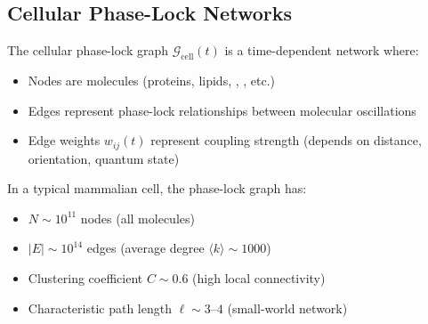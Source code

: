 \subsection{Cellular Phase-Lock Networks}

\begin{definition}
\label{def:cellular_phase_lock}
The cellular phase-lock graph $\mathcal{G}_{\text{cell}}(t)$ is a time-dependent network where:
\begin{itemize}
\item Nodes are molecules (proteins, lipids, , , etc.)
\item Edges represent phase-lock relationships between molecular oscillations
\item Edge weights $w_{ij}(t)$ represent coupling strength (depends on distance, orientation, quantum state)
\end{itemize}
\end{definition}

\begin{theorem}
\label{thm:cellular_density}
In a typical mammalian cell, the phase-lock graph has:
\begin{itemize}
\item $N \sim 10^{11}$ nodes (all molecules)
\item $|E| \sim 10^{14}$ edges (average degree $\langle k \rangle \sim 1000$)
\item Clustering coefficient $C \sim 0.6$ (high local connectivity)
\item Characteristic path length $\ell \sim 3$--$4$ (small-world network)
\end{itemize}
\end{theorem}

